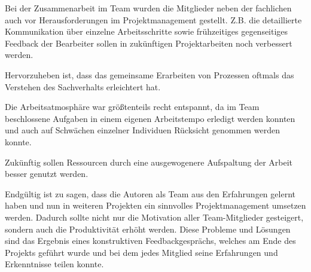 Bei der Zusammenarbeit im Team wurden die Mitglieder neben der fachlichen auch vor Herausforderungen im Projektmanagement gestellt. Z.B. die detaillierte Kommunikation über einzelne Arbeitsschritte sowie frühzeitiges gegenseitiges Feedback der Bearbeiter sollen in zukünftigen Projektarbeiten noch verbessert werden.

Hervorzuheben ist, dass das gemeinsame Erarbeiten von Prozessen oftmals das Verstehen des Sachverhalts erleichtert hat.

Die Arbeitsatmosphäre war größtenteils recht entspannt, da im Team beschlossene Aufgaben in einem eigenen Arbeitstempo erledigt werden konnten und auch auf Schwächen einzelner Individuen Rücksicht genommen werden konnte.

Zukünftig sollen Ressourcen durch eine ausgewogenere Aufspaltung der Arbeit besser genutzt werden.


Endgültig ist zu sagen, dass die Autoren als Team aus den Erfahrungen gelernt haben und nun in weiteren Projekten ein sinnvolles Projektmanagement umsetzen werden.
Dadurch sollte nicht nur die Motivation aller Team-Mitglieder gesteigert, sondern auch die Produktivität erhöht werden.
Diese Probleme und Lösungen sind das Ergebnis eines konstruktiven Feedbackgesprächs, welches am Ende des Projekts geführt wurde und bei dem jedes Mitglied seine Erfahrungen und Erkenntnisse teilen konnte.
